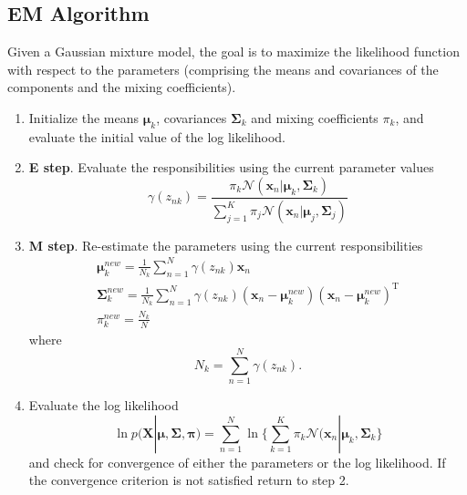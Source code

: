 ﻿\documentclass[a4paper, 11pt]{article}
\numberwithin{equation}{subsection}
\begin{document}
\subsection{EM Algorithm}
Given a Gaussian mixture model, the goal is to maximize the likelihood function with respect to the parameters (comprising the means and covariances of the components and the mixing coefficients).
\begin{enumerate}
	\item Initialize the means $\boldsymbol\mu_k$, covariances $\boldsymbol\Sigma_k$ and mixing coefficients $\pi_k$, and evaluate the initial value of the log likelihood.
	\item \textbf{E step}. Evaluate the responsibilities using the current parameter values
	\begin{equation}
	\gamma(z_{nk})=\frac{\pi_k\mathcal N(\mathbf x_n|\boldsymbol\mu_k,\boldsymbol\Sigma_k)}{\sum_{j=1}^K\pi_j\mathcal N(\mathbf x_n|\boldsymbol\mu_j,\boldsymbol\Sigma_j)}
	\end{equation}
	\item \textbf{M step}. Re-estimate the parameters using the current responsibilities
	\begin{gather}
	\boldsymbol\mu_k^{new}=\frac{1}{N_k}\sum_{n=1}^N\gamma(z_{nk})\mathbf x_n\\
	\boldsymbol\Sigma_k^{new}=\frac{1}{N_k}\sum_{n=1}^N\gamma(z_{nk})(\mathbf x_n-\boldsymbol\mu_k^{new})(\mathbf x_n-\boldsymbol\mu_k^{new})^{\mathrm T}\\
	\pi_k^{new}=\frac{N_k}{N}
	\end{gather}
	where 
	\begin{equation}
	N_k=\sum_{n=1}^N\gamma(z_{nk}).
	\end{equation}
	\item Evaluate the log likelihood
	\begin{equation}
	\ln p(\mathbf X|\boldsymbol\mu,\boldsymbol\Sigma,\boldsymbol\pi)=\sum_{n=1}^N\ln \{\sum_{k=1}^K\pi_k\mathcal N(\mathbf x_n|\boldsymbol\mu_k,\boldsymbol\Sigma_k\}
	\end{equation}
	and check for convergence of either the parameters or the log likelihood. If the convergence criterion is not satisfied return to step 2.
	
\end{enumerate}
\end{document}
